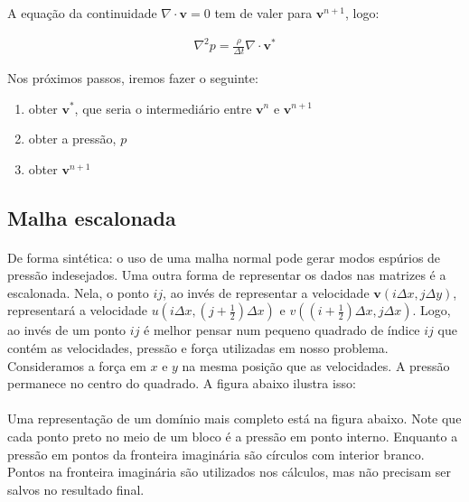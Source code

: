 \documentclass[introducao.tex]{subfiles}
\begin{document}
A equação da continuidade $\nabla\cdot \textbf{v}=0$ tem de valer para $\textbf{v}^{n+1}$, logo:

\begin{eqnarray}
\nabla^2 p = \frac{\rho}{\Delta t}\nabla\cdot\textbf{v}^*\label{eqpressao}
\end{eqnarray}

Nos próximos passos, iremos fazer o seguinte:

\begin{enumerate}
\item obter $\textbf{v}^*$, que seria o intermediário entre $\textbf{v}^n$ e $\textbf{v}^{n+1}$
\item  obter a pressão, $p$
\item obter $\textbf{v}^{n+1}$
\end{enumerate}

\subsection{Malha escalonada}
\paragraph{} De forma sintética: o uso de uma malha normal pode gerar modos espúrios de pressão indesejados. Uma outra forma de representar os dados nas matrizes é a escalonada. Nela, o ponto $ij$, ao invés de representar a velocidade $\textbf{v}(i\Delta x, j\Delta y)$, representará a velocidade  $u(i\Delta x, (j+\frac{1}{2})\Delta x)$ e $v((i+\frac{1}{2})\Delta x, j\Delta x)$. Logo, ao invés de um ponto $ij$ é melhor pensar num pequeno quadrado de índice $ij$ que contém as velocidades, pressão e força utilizadas em nosso problema. Consideramos a força em $x$ e $y$ na mesma posição que as velocidades. A pressão permanece no centro do quadrado. A figura abaixo ilustra isso:

\begin{center}
\end{center}

\paragraph{} Uma representação de um domínio mais completo está na figura abaixo. Note que cada ponto preto no meio de um bloco é a pressão em ponto interno. Enquanto a pressão em pontos da fronteira imaginária são círculos com interior branco. Pontos na fronteira imaginária são utilizados nos cálculos, mas não precisam ser salvos no resultado final.
\end{document}
